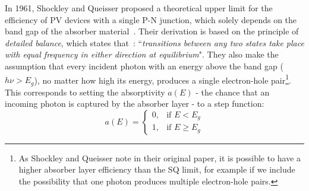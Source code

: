 \begin{refsection}
In 1961, Shockley and Queisser proposed a theoretical upper limit for the 
efficiency of PV devices with a single P-N junction, which solely depends on 
the band gap of the absorber material~\cite{Shockley1961}. Their derivation is 
based on the principle of \textit{detailed balance}, which states 
that~\cite{Klein1955}: ``\textit{transitions between any two states take place 
with equal frequency in either direction at equilibrium}". They also make the 
assumption that every incident photon with an energy above the band gap ($h\nu 
> E_g$), no matter how high its energy, produces a single electron-hole 
pair\footnote{As Shockley and Queisser note in their original paper, it is 
possible to have a higher absorber layer efficiency than the SQ limit, for 
example if we include the possibility that one photon produces multiple 
electron-hole pairs.}. This corresponds to setting the absorptivity $a(E)$ - 
the chance that an incoming photon is captured by the absorber layer - to a 
step function: 
\begin{equation}\label{slme:eq-step_a} 
a(E) =  \begin{cases} 0, & \mbox{if } E < E_g \\ 1, & \mbox{if } E \geq E_g 
\end{cases} 
\end{equation} 
 

\end{refsection}
